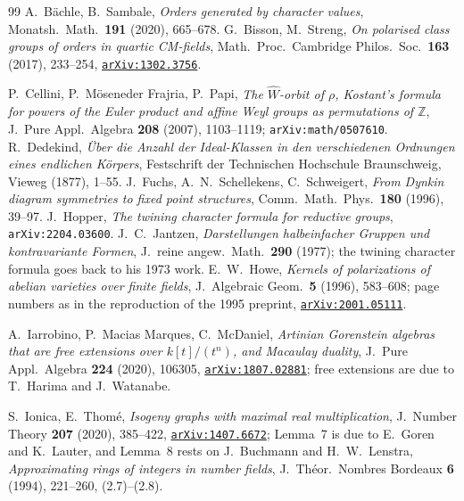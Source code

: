 \documentclass[11pt,a4paper]{article}
\theoremstyle{definition}
\begin{document}
\begin{thebibliography}{99}
 A.~B\"achle, B.~Sambale, \emph{Orders generated by character values},
Monatsh.~Math.~\textbf{191} (2020), 665--678.
 G.~Bisson, M.~Streng, \emph{On polarised class groups of orders in quartic
CM-fields}, Math.~Proc.~Cambridge Philos.~Soc.~\textbf{163} (2017), 233--254,
\href{https://arxiv.org/abs/1302.3756}{\texttt{arXiv:1302.3756}}.

 P.~Cellini, P.~M\"oseneder Frajria, P.~Papi, \emph{The $\widehat W$-orbit of $\rho$,
Kostant's formula for powers of the Euler product and affine Weyl groups as permutations of
$\mathbb{Z}$}, J.~Pure Appl.~Algebra \textbf{208} (2007), 1103--1119;
\texttt{arXiv:math/0507610}.
 R.~Dedekind, \emph{\"Uber die Anzahl der Ideal-Klassen in den verschiedenen Ordnungen
eines endlichen K\"orpers}, Festschrift der Technischen Hochschule Braunschweig, Vieweg (1877),
1--55.
 J.~Fuchs, A.~N.~Schellekens, C.~Schweigert, \emph{From Dynkin diagram symmetries to
fixed point structures}, Comm.~Math.~Phys.~\textbf{180} (1996), 39--97.
 J.~Hopper, \emph{The twining character formula for reductive groups},
\texttt{arXiv:2204.03600}.
 J.~C.~Jantzen, \emph{Darstellungen halbeinfacher Gruppen und kontravariante Formen},
J.~reine angew.~Math.~\textbf{290} (1977); the twining character formula goes back to his 1973 work.
 E.~W.~Howe, \emph{Kernels of polarizations of abelian varieties over finite fields},
J.~Algebraic Geom.~\textbf{5} (1996), 583--608; page numbers as in the reproduction of the 1995
preprint, \href{https://arxiv.org/abs/2001.05111}{\texttt{arXiv:2001.05111}}.

 A.~Iarrobino, P.~Macias Marques, C.~McDaniel, \emph{Artinian Gorenstein algebras that
are free extensions
over $k[t]/(t^n)$, and Macaulay duality}, J.~Pure Appl.~Algebra \textbf{224} (2020), 106305,
\href{https://arxiv.org/abs/1807.02881}{\texttt{arXiv:1807.02881}}; free extensions are due to
T.~Harima and J.~Watanabe.

 S.~Ionica, E.~Thom\'e, \emph{Isogeny graphs with maximal real multiplication},
J.~Number Theory \textbf{207} (2020), 385--422,
\href{https://arxiv.org/abs/1407.6672}{\texttt{arXiv:1407.6672}}; Lemma~7 is due to E.~Goren and
K.~Lauter, and Lemma~8 rests on J.~Buchmann and H.~W.~Lenstra, \emph{Approximating rings of
integers in number fields}, J.~Th\'eor.~Nombres Bordeaux \textbf{6} (1994), 221--260, (2.7)--(2.8).


\end{thebibliography}
\end{document}
